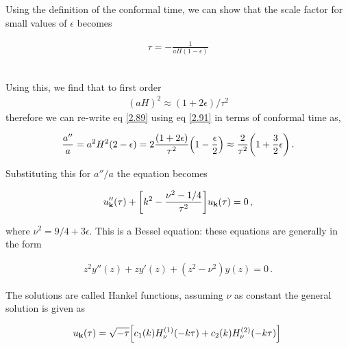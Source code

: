 Using the definition of the conformal time, we can show that the scale factor for small values of $\epsilon$ becomes

\begin{align}
    \tau = - \frac{1}{a H (1 - \epsilon )}\label{2.90}
\end{align}
\
 
Using this, we find that to first order 
\begin{align}
    (aH)^2 \approx (1 + 2 \epsilon ) / \tau^2 \label{2.91}
\end{align}
therefore we can re-write eq \ref{2.89}  using eq \ref{2.91} in terms of conformal time as,

\begin{align}
    \frac{a''}{a} = a^2 H^2 (2- \epsilon ) 
    =2 \frac{(1 + 2 \epsilon)}{\tau^2} \qty(1 - \frac{\epsilon}{2})
    \approx \frac{2}{\tau^2} \qty(1 + \frac{3}{2} \epsilon ) \label{2.92}
    \,.
\end{align}

Substituting this for \(a'' /a\) the equation becomes 

\begin{align}
    u''_{\mathbf{k}}(\tau ) + \qty[k^2 - \frac{\nu^2 - 1/4}{\tau^2}]  u_{\mathbf{k}}(\tau )= 0 \,,\label{2.93}
\end{align}

where \(\nu^2 = 9/4 + 3 \epsilon \). 
This is a Bessel equation: these equations are generally in the form 

\begin{align}
    z^2 y'' (z) + z y' (z) + (z^2 - \nu^2) y(z) = 0\,.
\end{align}

The solutions are called Hankel functions, assuming \(\nu\) as constant the general solution is given as

\begin{align}
     u_{\mathbf{k}}(\tau ) = \sqrt{- \tau } \qty[ c_1 (k) H_\nu^{(1)} (-k\tau ) + c_2 (k) H_\nu^{(2)} (-k\tau )] \,\label{2.95}
\end{align}

